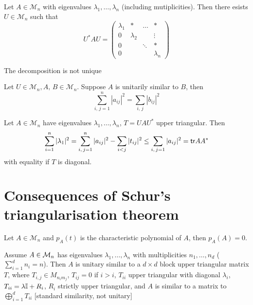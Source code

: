 \documentclass[aspectratio=169]{beamer}
\begin{document}
\begin{frame}
\begin{theorem}
Let $A\in \mathcal{M}_n$ with eigenvalues $\lambda_1, \ldots, \lambda_n$ (including mutiplicities). Then there esists $U\in \mathcal{M}_n$ such that 
\[U^* AU = \begin{pmatrix}
\lambda_1& * & \ldots &*\\
0 & \lambda_2& & \vdots\\
0&  &\ddots& * \\
0&& & \lambda_n
\end{pmatrix}\]
\end{theorem}
\vfill
\begin{remark}
The decomposition is not unique
\end{remark}
\end{frame}

\begin{frame}
\begin{theorem}
Let $U\in \mathcal{M}_n, A,\, B\in \mathcal{M}_n$. Suppose $A$ is unitarily similar to $B$, then 
\[\sum\limits_{i,\,j=1}^n | a_{ij}|^2= \sum\limits_{i,\, j}|b_{ij}|^2\]
\end{theorem}
\vfill
\begin{corollary}
Let $A\in \mathcal{M}_n$ have eigenvalues $\lambda_1, \ldots, \lambda_n$, $T= UAU^*$ upper triangular. Then 
\[\sum\limits_{i=1}^n |\lambda_1|^2= \sum\limits_{i,\,j=1}^n | a_{ij}|^2- \sum\limits_{i<j} |t_{ij}|^2\leq \sum\limits_{i,\,j=1} |a_{ij}|^2= \mathsf{tr} AA^*\]
with equality if $T$ is diagonal.
\end{corollary}
\end{frame}

\section{Consequences of Schur's triangularisation theorem}


\begin{frame}
\begin{theorem}Let $A\in \mathcal{M}_n$ and $p_A(t)$ is the characteristic polynomial of $A$, then $p_A(A)=0$.
\end{theorem}
\vfill
\begin{theorem}
Assume $A\in \mathcal{M}_n$ has eigenvalues $\lambda_1, \ldots, \lambda_n$ with multiplicities $n_1, \ldots, n_d$ ($\sum\limits_{i=1}^d n_i=n$). Then  $A$ is unitary similar to a $d\times d$ block upper triangular matrix $T$, where $T_{i,j}\in M_{n_im_j}$, $T_{ij}=0$ if $i>i$, $T_{ii}$ upper triangular with diagonal $\lambda_i$, $T_{ii}=\lambda \mathbb{I}+ R_i$, $R_i$ strictly upper triangular, and $A$ is similar to a matrix to $\bigoplus\limits_{i=1}^d T_{ii}$ [standard similarity, not unitary] 
\end{theorem}
\end{frame}
\end{document}
